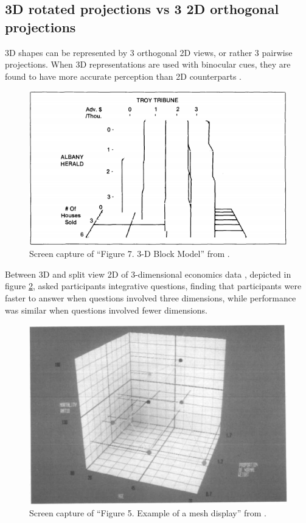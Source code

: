 \documentclass{monashthesis}
\begin{document}
\subsection{3D rotated projections vs 3 2D orthogonal
projections}\label{d-rotated-projections-vs-3-2d-orthogonal-projections}

3D shapes can be represented by 3 orthogonal 2D views, or rather 3
pairwise projections. When 3D representations are used with binocular
cues, they are found to have more accurate perception than 2D
counterparts \autocite[depicted in figure
\ref{fig:lee86fig}]{lee_effects_1986}.




\begin{figure}

{\centering \includegraphics[width=0.7\linewidth]{./figures/lee86fig} 

}

\caption{Screen capture of ``Figure 7. 3-D Block Model'' from
\textcite{lee_effects_1986}.}\label{fig:lee86fig}
\end{figure}

Between 3D and split view 2D of 3-dimensional economics data
\textcite{wickens_implications_1994}, depicted in figure
\ref{fig:wickens94fig}, asked participants integrative questions,
finding that participants were faster to answer when questions involved
three dimensions, while performance was similar when questions involved
fewer dimensions.




\begin{figure}

{\centering \includegraphics[width=0.7\linewidth]{./figures/wickens94fig} 

}

\caption{Screen capture of ``Figure 5. Example of a mesh
display'' from \textcite{wickens_implications_1994}.}\label{fig:wickens94fig}
\end{figure}
\end{document}
